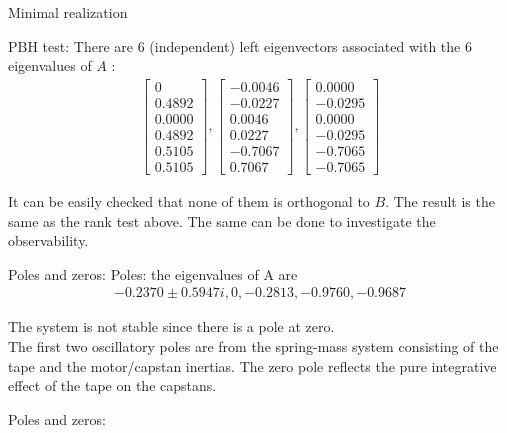 \begin{subsection}{Minimal realization}
\begin{frame}{PBH test:}
There are 6 (independent) left eigenvectors associated with
the 6 eigenvalues of $A$ :
\begin{align*}
    \begin{bmatrix}
        0\\
    0.4892\\
    0.0000\\
    0.4892\\
    0.5105\\
    0.5105
    \end{bmatrix},
    \begin{bmatrix}
    -0.0046\\
    -0.0227\\
    0.0046\\
    0.0227\\
    -0.7067\\
    0.7067
    \end{bmatrix},
    \begin{bmatrix}
    0.0000\\
    -0.0295\\
    0.0000\\
    -0.0295\\
    -0.7065\\
    -0.7065
    \end{bmatrix}
    \end{align*}
    
It can be easily checked that none of them is orthogonal to
$B$. The result is the same as the rank test above.
The same can be done to investigate the observability.
\end{frame}




\begin{frame}{Poles and zeros:}
Poles: the eigenvalues of A are
\begin{align*}
-0.2370\pm0.5947i, 0, -0.2813, −0.9760, -0.9687
\end{align*}

The system is not stable since there is a pole at zero.\\
\vspace{0.5cm}
The first two oscillatory poles are from the spring-mass
system consisting of the tape and the motor/capstan inertias.
The zero pole reflects the pure integrative effect of
the tape on the capstans.
\end{frame}

\begin{frame}{Poles and zeros:}


\end{frame}
\end{subsection}
